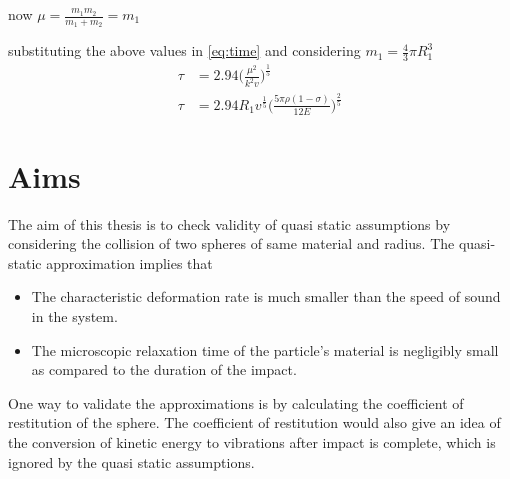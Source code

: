 now $\mu=\frac{m_{1}m_{2}}{m_{1}+m_{2}}=m_{1}$

substituting the above values in \ref{eq:time} and considering $m_{1}=\frac{4}{3}\pi R_{1}^{3}$
\begin{align*}
\tau &= 2.94 \Big( \frac{\mu^{2}}{k^{2}v} \Big)^{\frac{1}{5}} \\
\tau &= 2.94R_{1}v^{\frac{1}{5}} \Big( \frac{5\pi \rho (1-\sigma)}{12E} \Big)^{\frac{2}{5}}
\end{align*}



\section{Aims}

The aim of this thesis is to check validity of quasi static assumptions by considering the collision of two spheres of same material and radius. The quasi-static approximation implies that
\begin{itemize}
\item The characteristic deformation rate is much smaller than the speed of sound in the system.
\item The microscopic relaxation time of the particle's material is negligibly small as compared to the duration of the impact.
\end{itemize}
One way to validate the approximations is by calculating the coefficient of restitution of the sphere. The coefficient of restitution would also give an idea of the conversion of kinetic energy to vibrations after impact is complete, which is ignored by the quasi static assumptions.
